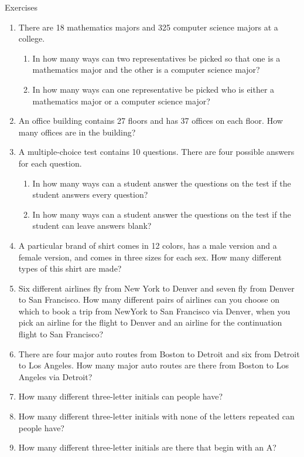 \documentclass[11pt,a4paper]{book}
\begin{document}
Exercises
\begin{enumerate}
\item There are 18 mathematics majors and 325 computer science majors at a college.
 \begin{enumerate}[label=(\alph*)]
 \item  In how many ways can two representatives be picked so that one is a mathematics major and the other is a computer science major?
 \item  In how many ways can one representative be picked who is either a mathematics major or a computer science major?
 \end{enumerate}
\item An office building contains 27 floors and has 37 offices on each floor. 
How many offices are in the building?
\item A multiple-choice test contains 10 questions.
There are four possible answers for each question.
\begin{enumerate}[label=(\alph*)]
\item In how many ways can a student answer the questions on the test if the student answers every question?
\item In how many ways can a student answer the questions on the test if the student can leave answers blank?
\end{enumerate}
\item A particular brand of shirt comes in 12 colors, has a male version and a female version, and comes in three sizes for each sex.
How many different types of this shirt are made?
\item Six different airlines fly from New York to Denver and seven fly from Denver to San Francisco.
How many different pairs of airlines can you choose on which to book a trip from NewYork to San Francisco via Denver, when you pick an airline for the flight to Denver and an airline for the continuation flight to San Francisco?
\item There are four major auto routes from Boston to Detroit and six from Detroit to Los Angeles.
How many major auto routes are there from Boston to Los Angeles via Detroit?
\item How many different three-letter initials can people have?
\item How many different three-letter initials with none of the letters repeated can people have?
\item How many different three-letter initials are there that begin with an A?

\end{enumerate}
\end{document}
